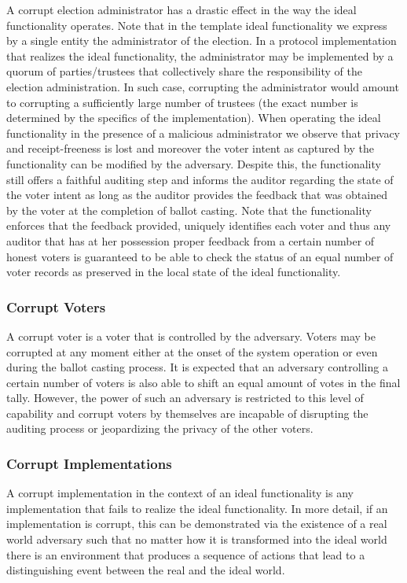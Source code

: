 A corrupt election administrator has a drastic effect in the way the
ideal functionality operates. Note that in the template ideal
functionality we express by a single entity the administrator of the
election. In a protocol implementation that realizes the ideal
functionality, the administrator may be implemented by a quorum of
parties/trustees that collectively share the responsibility of the
election administration. In such case, corrupting the administrator
would amount to corrupting a sufficiently large number of trustees
(the exact number is determined by the specifics of the
implementation).  When operating the ideal functionality in the
presence of a malicious administrator we observe that privacy and
receipt-freeness is lost and moreover the voter intent as captured by
the functionality can be modified by the adversary. Despite this, the
functionality still offers a faithful auditing step and informs the
auditor regarding the state of the voter intent as long as the auditor
provides the feedback that was obtained by the voter at the completion
of ballot casting. Note that the functionality enforces that the
feedback provided, uniquely identifies each voter and thus any auditor
that has at her possession proper feedback from a certain number of
honest voters is guaranteed to be able to check the status of an equal
number of voter records as preserved in the local state of the ideal
functionality.

\subsubsection{Corrupt Voters} 

A corrupt voter is a voter that is controlled by the adversary. Voters
may be corrupted at any moment either at the onset of the system
operation or even during the ballot casting process. It is expected
that an adversary controlling a certain number of voters is also able
to shift an equal amount of votes in the final tally. However, the
power of such an adversary is restricted to this level of capability
and corrupt voters by themselves are incapable of disrupting the
auditing process or jeopardizing the privacy of the other voters.

\subsubsection{Corrupt Implementations} 

A corrupt implementation in the context of an ideal functionality is
any implementation that fails to realize the ideal functionality. In
more detail, if an implementation is corrupt, this can be demonstrated
via the existence of a real world adversary such that no matter how it
is transformed into the ideal world there is an environment that
produces a sequence of actions that lead to a distinguishing event
between the real and the ideal world.

